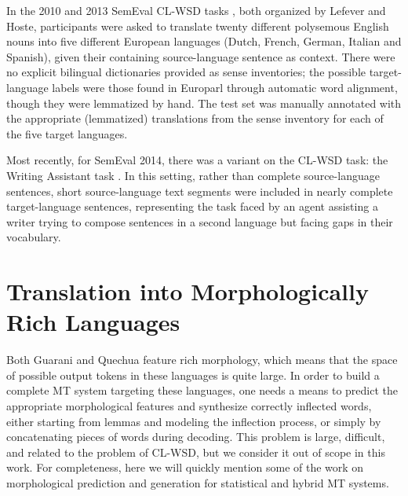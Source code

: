 In the 2010 and 2013 SemEval CL-WSD tasks
\cite{lefever-hoste:2010:SemEval,task10}, both organized by Lefever and Hoste,
participants were asked to translate twenty different polysemous English nouns
into five different European languages (Dutch, French, German, Italian and
Spanish), given their containing source-language sentence as context. There
were no explicit bilingual dictionaries provided as sense inventories; the
possible target-language labels were those found in Europarl \cite{europarl}
through automatic word alignment, though they were lemmatized by hand. The test
set was manually annotated with the appropriate (lemmatized) translations from
the sense inventory for each of the five target languages.

Most recently, for SemEval 2014, there was a variant on the CL-WSD task: the
Writing Assistant task \cite{vangompel-EtAl:2014:SemEval}. In this setting,
rather than complete source-language sentences, short source-language text
segments were included in nearly complete target-language sentences,
representing the task faced by an agent assisting a writer trying to compose
sentences in a second language but facing gaps in their vocabulary.

\section{Translation into Morphologically Rich Languages}
Both Guarani and Quechua feature rich morphology, which means that the space of
possible output tokens in these languages is quite large. In order to build a
complete MT system targeting these languages, one needs a means to predict the
appropriate morphological features and synthesize correctly inflected words,
either starting from lemmas and modeling the inflection process, or simply by
concatenating pieces of words during decoding. This problem is large,
difficult, and related to the problem of CL-WSD, but we consider it out of
scope in this work. For completeness, here we will quickly mention some of the
work on morphological prediction and generation for statistical and hybrid MT
systems.

